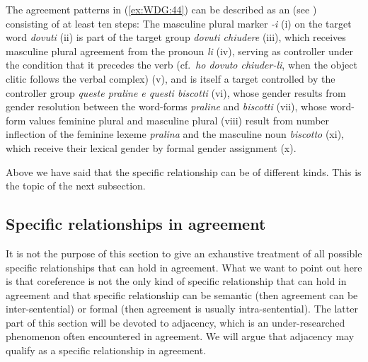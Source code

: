 \documentclass[output=collectionpaper]{langsci/langscibook}
\begin{document}
%

The agreement patterns in (\ref{ex:WDG:44}) can be described as an  (see \citealt{Waelchli2018}) consisting of at least ten steps: The masculine plural marker \textit{-i} (i) on the target word \textit{dovuti} (ii) is part of the target group \textit{dovuti chiudere} (iii), which receives masculine plural agreement from the pronoun \textit{li} (iv), serving as controller under the condition that it precedes the verb (cf.\ \textit{ho dovuto chiuder-li}, when the object clitic follows the verbal complex) (v), and is itself a target controlled by the controller group \textit{queste praline e questi biscotti} (vi), whose gender results from gender resolution between the word-forms \textit{praline} and \textit{biscotti} (vii), whose word-form values feminine plural and masculine plural (viii) result from number inflection of the feminine lexeme \textit{pralina} and the masculine noun \textit{biscotto} (xi), which receive their lexical gender by formal gender assignment (x).

Above we have said that the specific relationship can be of different kinds. This is the topic of the next subsection.

  \subsection{Specific relationships in agreement}
\label{sec:WDG:7.2}

It is not the purpose of this section to give an exhaustive treatment of all possible specific relationships that can hold in agreement. What we want to point out here is that coreference is not the only kind of specific relationship that can hold in agreement and that specific relationship can be semantic (then agreement can be inter-sentential) or formal (then agreement is usually intra-sentential). The latter part of this section will be devoted to adjacency, which is an under-researched phenomenon often encountered in agreement. We will argue that adjacency may qualify as a specific relationship in agreement.
\end{document}
